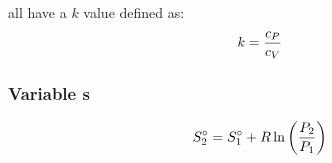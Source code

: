  all have a $k$ value defined as:
\begin{equation*}
  k = \frac{c_{P}}{c_{V}}
\end{equation*}

\subsubsection{Variable s}\label{subsubsec:Variable_Specific_Heats}
\begin{equation}\label{eq:Entropy_Change-Ideal_Gas-Variable_Specific_Heat}
  S_{2}^{\circ} = S_{1}^{\circ} + R \ln \left( \frac{P_{2}}{P_{1}} \right)
\end{equation}

